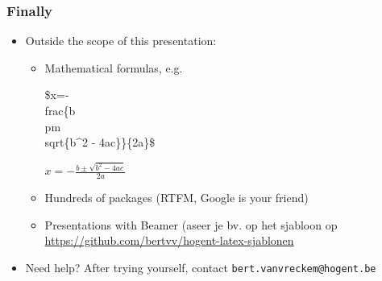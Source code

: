\documentclass{beamer}
\begin{document}
\begin{frame}
  \frametitle{Finally}
  
  \begin{itemize}
  \item Outside the scope of this presentation:
    \begin{itemize}
    \item<+-> Mathematical formulas, e.g.
    \begin{semiverbatim}
    \$x=-\\frac\{b \\pm \\sqrt\{b\^{}2 - 4ac\}\}\{2a\}\$
    \end{semiverbatim}
    $x=-\frac{b \pm \sqrt{b^2 - 4ac}}{2a}$
    \item<+-> Hundreds of packages (RTFM, Google is your friend)
    \item<+-> Presentations with Beamer (aseer je bv. op het sjabloon op \url{https://github.com/bertvv/hogent-latex-sjablonen}

    \end{itemize}
  \item<+-> Need help? After trying yourself, contact \texttt{bert.vanvreckem@hogent.be}
  \end{itemize}
\end{frame}
\end{document}
